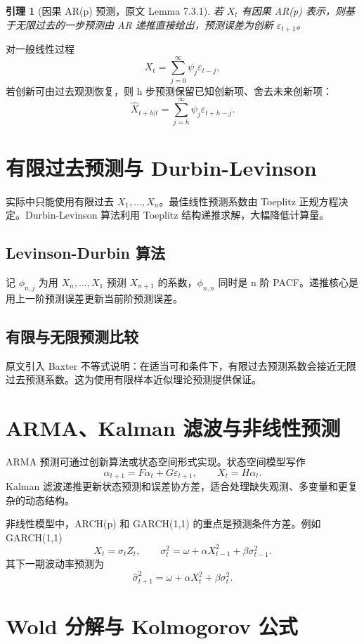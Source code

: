 \documentclass[11pt,a4paper]{ctexart}
\newtheorem{lemma}{引理}[section]
\begin{document}
\begin{lemma}[因果 AR(p) 预测，原文 Lemma 7.3.1]
若 \(X_t\) 有因果 AR(p) 表示，则基于无限过去的一步预测由 AR 递推直接给出，预测误差为创新 \(\varepsilon_{t+1}\)。
\end{lemma}

对一般线性过程
\[
  X_t=\sum_{j=0}^{\infty}\psi_j\varepsilon_{t-j},
\]
若创新可由过去观测恢复，则 h 步预测保留已知创新项、舍去未来创新项：
\[
  \hat X_{t+h|t}=\sum_{j=h}^{\infty}\psi_j\varepsilon_{t+h-j}.
\]

\section{有限过去预测与 Durbin-Levinson}

实际中只能使用有限过去 \(X_1,\ldots,X_n\)。最佳线性预测系数由 Toeplitz 正规方程决定。Durbin-Levinson 算法利用 Toeplitz 结构递推求解，大幅降低计算量。

\subsection{Levinson-Durbin 算法}

记 \(\phi_{n,j}\) 为用 \(X_n,\ldots,X_1\) 预测 \(X_{n+1}\) 的系数，\(\phi_{n,n}\) 同时是 n 阶 PACF。递推核心是用上一阶预测误差更新当前阶预测误差。

\subsection{有限与无限预测比较}

原文引入 Baxter 不等式说明：在适当可和条件下，有限过去预测系数会接近无限过去预测系数。这为使用有限样本近似理论预测提供保证。

\section{ARMA、Kalman 滤波与非线性预测}

ARMA 预测可通过创新算法或状态空间形式实现。状态空间模型写作
\[
  \alpha_{t+1}=F\alpha_t+G\varepsilon_{t+1},\qquad
  X_t=H\alpha_t.
\]
Kalman 滤波递推更新状态预测和误差协方差，适合处理缺失观测、多变量和更复杂的动态结构。

非线性模型中，ARCH(p) 和 GARCH(1,1) 的重点是预测条件方差。例如 GARCH(1,1)
\[
  X_t=\sigma_tZ_t,\qquad
  \sigma_t^2=\omega+\alpha X_{t-1}^2+\beta\sigma_{t-1}^2.
\]
其下一期波动率预测为
\[
  \hat\sigma_{t+1}^2=\omega+\alpha X_t^2+\beta\sigma_t^2.
\]

\section{Wold 分解与 Kolmogorov 公式}
\end{document}
